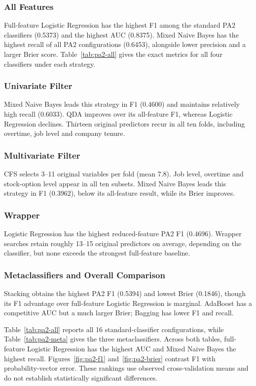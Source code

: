 \subsubsection{All Features}
Full-feature Logistic Regression has the highest F1 among the standard PA2
classifiers (0.5373) and the highest AUC (0.8375). Mixed Naive Bayes has the
highest recall of all PA2 configurations (0.6453), alongside lower precision
and a larger Brier score. Table~\ref{tab:pa2-all} gives the exact metrics for
all four classifiers under each strategy.

\subsubsection{Univariate Filter}
Mixed Naive Bayes leads this strategy in F1 (0.4600) and maintains relatively
high recall (0.6033). QDA improves over its all-feature F1, whereas Logistic
Regression declines. Thirteen original predictors recur in all ten folds,
including overtime, job level and company tenure.

\subsubsection{Multivariate Filter}
CFS selects 3--11 original variables per fold (mean 7.8). Job level, overtime
and stock-option level appear in all ten subsets.
Mixed Naive Bayes leads this strategy in F1 (0.3962), below its all-feature
result, while its Brier improves.

\subsubsection{Wrapper}
Logistic Regression has the highest reduced-feature PA2 F1 (0.4696). Wrapper
searches retain roughly 13--15 original predictors on average, depending on
the classifier, but none exceeds the strongest full-feature baseline.

\subsubsection{Metaclassifiers and Overall Comparison}
Stacking obtains the highest PA2 F1 (0.5394) and lowest Brier (0.1846), though
its F1 advantage over full-feature Logistic Regression is marginal. AdaBoost
has a competitive AUC but a much larger Brier; Bagging has lower F1 and recall.

Table~\ref{tab:pa2-all} reports all 16 standard-classifier configurations, while
Table~\ref{tab:pa2-meta} gives the three metaclassifiers. Across both tables,
full-feature Logistic Regression has the highest AUC and Mixed Naive Bayes
the highest recall.
Figures~\ref{fig:pa2-f1} and~\ref{fig:pa2-brier} contrast F1 with
probability-vector error.
These rankings use observed cross-validation means and do not establish
statistically significant differences.

